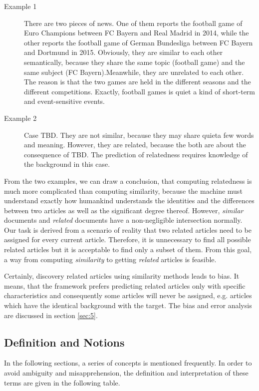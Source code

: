 \begin{description}
\item[Example 1] There are two pieces of news. One of them reports the football game of Euro Champions between FC Bayern and Real Madrid in 2014, while the other reports the football game of German Bundesliga between FC Bayern and Dortmund in 2015. Obviously, they are similar to each other semantically, because they share the same topic (football game) and the same subject (FC Bayern).Meanwhile, they are unrelated to each other. The reason is that the two games are held in the different seasons and the different competitions. Exactly, football games is quiet a kind of short-term and event-sensitive events. 
\item[Example 2] Case TBD. They are not similar, because they may share quieta few words and meaning. However, they are related, because the both are about the consequence of TBD. The prediction of relatedness requires knowledge of the background in this case.
\end{description}

From the two examples, we can draw a conclusion, that computing relatedness is much more complicated than computing similarity, because the machine must understand exactly how humankind understands the identities and the differences between two articles as well as the significant degree thereof. However, \textit{similar} documents and \textit{related} documents have a non-negligible intersection normally. Our task is derived from a scenario of reality that two related articles need to be assigned for every current article. Therefore, it is unnecessary to find all possible related articles but it is acceptable to find only a subset of them. From this goal, a way from computing \textit{similarity} to getting \textit{related} articles is feasible. 

Certainly, discovery related articles using similarity methods leads to bias. It means, that the framework prefers predicting related articles only with specific characteristics and consequently some articles will never be assigned, e.g. articles which have the identical background with the target. The bias and error analysis are discussed in section \ref{sec:5}.

\subsection{Definition and Notions}
\label{sec:4.2}

In the following sections, a series of concepts is mentioned frequently. In order to avoid ambiguity and misapprehension, the definition and interpretation of these terms are given in the following table.

